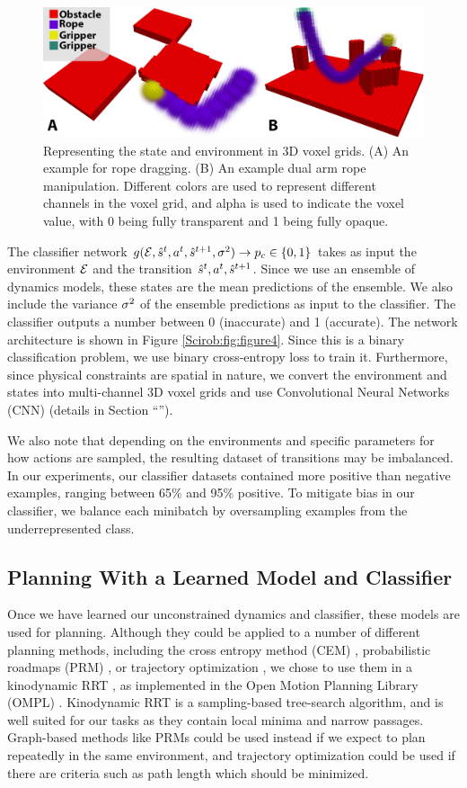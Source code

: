 \begin{figure}
    \centering
    \includegraphics[width=0.6\linewidth]{Chap2/images/figure5}
    \caption{Representing the state and environment in 3D voxel grids. (A) An example for rope dragging. (B) An example dual arm rope manipulation. Different colors are used to represent different channels in the voxel grid, and alpha is used to indicate the voxel value, with 0 being fully transparent and 1 being fully opaque.}
    \label{Scirob:fig:3DClassifierInput}
\end{figure}

The classifier network $g(\mathcal{E}, \hat{s}^{t},a^{t},\hat{s}^{t+1},\sigma^2) \rightarrow p_c \in \{0,1\}$ takes as input the environment $\mathcal{E}$ and the transition $\hat{s}^{t},a^{t},\hat{s}^{t+1}$. Since we use an ensemble of dynamics models, these states are the mean predictions of the ensemble. We also include the variance $\sigma^2$ of the ensemble predictions as input to the classifier. The classifier outputs a number between 0 (inaccurate) and 1 (accurate). The network architecture is shown in Figure \ref{Scirob:fig:figure4}. Since this is a binary classification problem, we use binary cross-entropy loss to train it. Furthermore, since physical constraints are spatial in nature, we convert the environment and states into multi-channel 3D voxel grids and use Convolutional Neural Networks (CNN) (details in Section ``'').

We also note that depending on the environments and specific parameters for how actions are sampled, the resulting dataset of transitions may be imbalanced. In our experiments, our classifier datasets contained more positive than negative examples, ranging between 65\% and 95\% positive. To mitigate bias in our classifier, we balance each minibatch by oversampling examples from the underrepresented class.

\subsection{Planning With a Learned Model and Classifier}
\label{Scirob:sec:planning}

Once we have learned our unconstrained dynamics and classifier, these models are used for planning. Although they could be applied to a number of different planning methods, including the cross entropy method (CEM) \cite{Kobilarov2011}, probabilistic roadmaps (PRM) \cite{Kavraki1996}, or trajectory optimization \cite{Ratliff2006}, we chose to use them in a kinodynamic RRT \cite{LaValle2001}, as implemented in the Open Motion Planning Library (OMPL) \cite{ompl}. Kinodynamic RRT is a sampling-based tree-search algorithm, and is well suited for our tasks as they contain local minima and narrow passages. Graph-based methods like PRMs could be used instead if we expect to plan repeatedly in the same environment, and trajectory optimization could be used if there are criteria such as path length which should be minimized.

